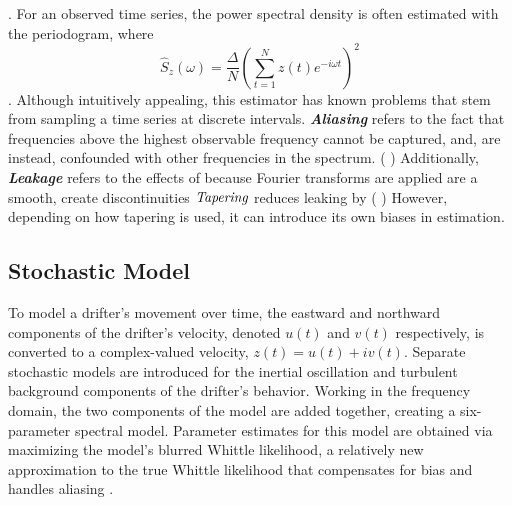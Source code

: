 \documentclass{stat572Style}
\newcommand{\hdcomment}[1]{({\color{red}{HD's comment:}} \textbf{\color{red}{#1}})}
\begin{document}
\noindent \citep{Sykulski2013}. For an observed time series, the power spectral density is often estimated with the periodogram, where 
\begin{equation}
\label{eq: perio}
\hat{S}_{z}(\omega) = \frac{\Delta}{N} \left( \sum_{t=1}^{N} z(t) e^{-i \omega t} \right)^{2}
\end{equation}
\citep{Sykulski2013}. 
Although intuitively appealing, this estimator has known problems that stem from  sampling a time series at discrete intervals. 
\textbf{\it{Aliasing}} refers to the fact that frequencies above the highest observable frequency cannot be captured, and, are instead, confounded with other frequencies in the spectrum.  
\hdcomment{Get this right!} Additionally, \textbf{\it{Leakage}} refers to the effects of because Fourier transforms are applied are a smooth, create discontinuities
$\textbf{\it{Tapering}}$ reduces leaking by \hdcomment{get this right!}
However, depending on how tapering is used, it can introduce its own  biases in estimation.  


\subsection{Stochastic Model}
 To model a drifter's movement over time, the eastward and northward components of the drifter's velocity, denoted $u(t)$ and $v(t)$ respectively, is converted to a complex-valued velocity, $z(t) = u(t) + iv(t)$. 
 Separate stochastic models are introduced for the inertial oscillation and turbulent background components of the drifter's behavior. 
 Working in the frequency domain, the two components of the model are added together, creating a six-parameter spectral model. 
 Parameter estimates for this model are obtained via maximizing the model's blurred Whittle likelihood, a relatively new approximation to the true Whittle likelihood that compensates for bias and handles aliasing \citep{Sykulski2013}. 
 
\end{document}
